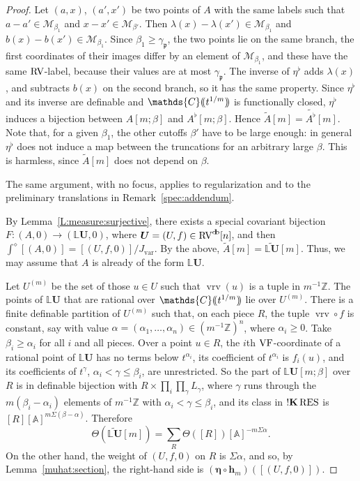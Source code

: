 \documentclass[12pt]{amsart}
\theoremstyle{plain}
\theoremstyle{definition}
\theoremstyle{remark}
\numberwithin{equation}{section}
\theoremstyle{plain}
\newcommand{\VF}{\textup{VF}}
\newcommand{\RV}{\textup{RV}}
\newcommand{\MM}{\mdl M}
\newcommand{\Z}{\mathds{Z}}
\newcommand{\A}{\mathds{A}}
\newcommand{\C}{\mathds{C}}
\newcommand{\gp}{\mathfrak{p}}
\newcommand{\0}{\emptyset}
\newcommand{\dpar}[1]{%
   (\mkern-4mu (#1 )\mkern-4mu )}
\newcommand{\mdl}[1]{\mathcal{#1}}  %
\newcommand{\bb}[1]{\mathbb{#1}}
\newcommand{\fun}{\longrightarrow}
\newcommand{\RES}{\textup{RES}}
\DeclareMathOperator{\sggk}{!\mathbf{K}}
\DeclareMathOperator{\vrv}{vrv}
\DeclareMathOperator{\db}{d \! b}
\begin{document}
\begin{proof}
Let $(a, x)$, $(a', x')$ be two points of $A$ with the same labels such that $a - a' \in \MM_{\beta_1}$ and $x - x' \in \MM_{\beta'}$. Then $\lambda(x) - \lambda(x') \in \MM_{\beta_1}$ and $b(x) - b(x') \in \MM_{\beta_1}$. Since $\beta_1 \geq \gamma_\gp$, the two points lie on the same branch, the first coordinates of their images differ by an element of $\MM_{\beta_1}$, and these have the same $\RV$-label, because their values are at most $\gamma_\gp$. The inverse of $\eta^\flat$ adds $\lambda(x)$, and subtracts $b(x)$ on the second branch, so it has the same property. Since $\eta^\flat$ and its inverse are definable and $\C \dpar{t^{1/m}}$ is functionally closed, $\eta^\flat$ induces a bijection between $A[m;\beta]$ and $A^\flat[m;\beta]$. Hence $\tilde A[m] = \widetilde{A^\flat}[m]$. Note that, for a given $\beta_1$, the other cutoffs $\beta'$ have to be large enough: in general $\eta^\flat$ does not induce a map between the truncations for an arbitrary large $\beta$. This is harmless, since $\tilde A[m]$ does not depend on $\beta$.

The same argument, with no focus, applies to regularization and to the preliminary translations in Remark~\ref{spec:addendum}.

By Lemma~\ref{L:measure:surjective}, there exists a special covariant bijection $F : (A, 0) \fun (\bb L \bm U, 0)$, where $\bm U = (U, f) \in \RV^{\db}[n]$, and then $\int^\diamond [(A, 0)] = [(U, f, 0)] / J_{\mathrm{var}}$. By the above, $\tilde A[m] = \widetilde{\bb L \bm U}[m]$. Thus, we may assume that $A$ is already of the form $\bb L \bm U$.

Let $U^{(m)}$ be the set of those $u \in U$ such that $\vrv(u)$ is a tuple in $m^{-1}\Z$. The points of $\bb L \bm U$ that are rational over $\C \dpar{t^{1/m}}$ lie over $U^{(m)}$. There is a finite definable partition of $U^{(m)}$ such that, on each piece $R$, the tuple $\vrv \circ f$ is constant, say with value $\alpha = (\alpha_1, \ldots, \alpha_n) \in (m^{-1}\Z)^n$, where $\alpha_i \geq 0$. Take $\beta_i \geq \alpha_i$ for all $i$ and all pieces. Over a point $u \in R$, the $i$th $\VF$-coordinate of a rational point of $\bb L \bm U$ has no terms below $t^{\alpha_i}$, its coefficient of $t^{\alpha_i}$ is $f_i(u)$, and its coefficients of $t^\gamma$, $\alpha_i < \gamma \leq \beta_i$, are unrestricted. So the part of $\bb L \bm U[m;\beta]$ over $R$ is in definable bijection with $R \times \prod_i \prod_\gamma L_\gamma$, where $\gamma$ runs through the $m(\beta_i - \alpha_i)$ elements of $m^{-1}\Z$ with $\alpha_i < \gamma \leq \beta_i$, and its class in $\sggk \RES$ is $[R] [\A]^{m \Sigma (\beta - \alpha)}$. Therefore
\[
\Theta(\widetilde{\bb L \bm U}[m]) = \sum_R \Theta([R]) [\A]^{-m \Sigma \alpha}.
\]
On the other hand, the weight of $(U, f, 0)$ on $R$ is $\Sigma \alpha$, and so, by Lemma~\ref{muhat:section}, the right-hand side is $(\bm \eta \circ \bm h_m)([(U, f, 0)])$.
\end{proof}
\end{document}
